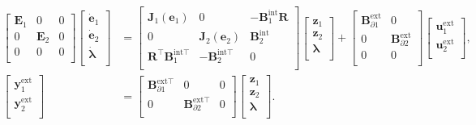 \documentclass{svjour3}                     %
\begin{document}
\begin{equation}
\label{eq:int_beams}
\begin{aligned}
\begin{bmatrix}
\mathbf{E}_1 & 0 & 0 \\ 
0 & \mathbf{E}_2 & 0 \\
0 & 0 & 0 \\
\end{bmatrix}
\begin{bmatrix}
\dot{\mathbf{e}}_1 \\ \dot{\mathbf{e}}_2 \\ \dot{\bm{\lambda}} \\
\end{bmatrix} &= 
\begin{bmatrix}
\mathbf{J}_1(\mathbf{e}_1) & 0 & -\mathbf{B}_1^{\text{int}} \mathbf{R} \\ 
0 & \mathbf{J}_2(\mathbf{e}_2) & \mathbf{B}_2^{\text{int}} \\
\mathbf{R}^\top \mathbf{B}_1^{\text{int} \top} & - \mathbf{B}_2^{\text{int} \top} & 0 \\
\end{bmatrix}
\begin{bmatrix}
\mathbf{z}_1  \\ 
\mathbf{z}_2  \\ 
\bm{\lambda} \\
\end{bmatrix}+ 
\begin{bmatrix}
\mathbf{B}_{\partial 1}^{\text{ext}} & 0 \\ 0 & \mathbf{B}_{\partial 2}^{\text{ext}} \\ 0 & 0 \\
\end{bmatrix} 
\begin{bmatrix}
\mathbf{u}_1^{\text{ext}} \\ 
\mathbf{u}_2^{\text{ext}} \\
\end{bmatrix}, \\
\begin{bmatrix}
\mathbf{y}_1^{\text{ext}} \\ \mathbf{y}_2^{\text{ext}} \\
\end{bmatrix}  &= \begin{bmatrix}
\mathbf{B}_{\partial 1}^{\text{ext} \top} & 0 & 0 \\
0 & \mathbf{B}_{\partial 2}^{\text{ext} \top} & 0 \\
\end{bmatrix} \begin{bmatrix}
\mathbf{z}_1  \\ 
\mathbf{z}_2  \\ 
\bm{\lambda} \\
\end{bmatrix}.
\end{aligned}
\end{equation}
\end{document}
